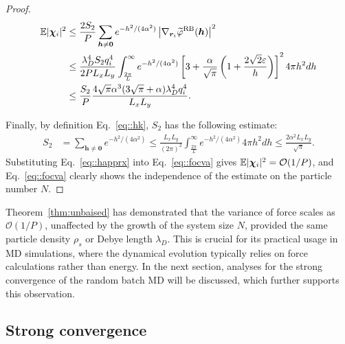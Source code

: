 \begin{proof}
	\begin{equation}\label{eq::focva}
		\begin{split}
			\mathbb{E}|\boldsymbol{\chi}_{i}|^2&\leq \frac{2S_2}{P}\sum_{\bm{h}\neq\bm{0}}e^{-h^2/(4\alpha^2)}\left|\nabla_{\bm{r}_i}\widetilde{\varphi}^{\text{RB}}(\bm{h})\right|^2\\
			&\leq \frac{\lambda_D^4 S_2 q_i^4}{2PL_xL_y} \int_{\frac{2\pi}{L}}^{\infty}e^{-h^2/(4\alpha^2)}\left[3+\frac{\alpha}{\sqrt{\pi}}\left(1+\frac{2\sqrt{2}\varepsilon}{h}\right)\right]^24\pi h^2dh\\
			&\leq \frac{S_2}{P}\frac{4\sqrt{\pi}\alpha^3(3\sqrt{\pi}+\alpha)\lambda_D^4 q_{i}^4}{L_xL_y}.
		\end{split}
	\end{equation}
	
	Finally, by definition Eq.~\ref{eq::hk}, $S_2$ has the following estimate:
	\begin{equation}\label{eq::happrx}
		\begin{split}
			S_2 &= \sum_{\bm{h}\neq\bm{0}}e^{-h^2/(4\alpha^2)}\leq \frac{L_xL_y}{(2\pi)^2}\int_{\frac{2\pi}{L}}^{\infty} e^{-h^2/(4\alpha^2)}4\pi h^2dh\leq \frac{2\alpha^2L_xL_y}{\sqrt{\pi}}.
		\end{split}
	\end{equation}
	Substituting Eq.~\eqref{eq::happrx} into Eq.~\eqref{eq::focva} gives $\mathbb{E}|\boldsymbol{\chi}_{i}|^2=\mathcal{O}(1/P)$, and Eq.~\eqref{eq::focva} clearly shows the independence of the estimate on the particle number $N$.
\end{proof}


Theorem~\ref{thm:unbaised} has demonstrated that the variance of force scales as $\mathcal{O}(1/P)$, unaffected by the growth of the system size $N$, provided the same particle density $\rho_s$ or Debye length $\lambda_D$. 
This is crucial for its practical usage in MD simulations, where the dynamical evolution typically relies on force calculations rather than energy. 
In the next section, analyses for the strong convergence of the random batch MD will be discussed, which further supports this observation.

\subsection{Strong convergence} \label{subsec::convergence}

